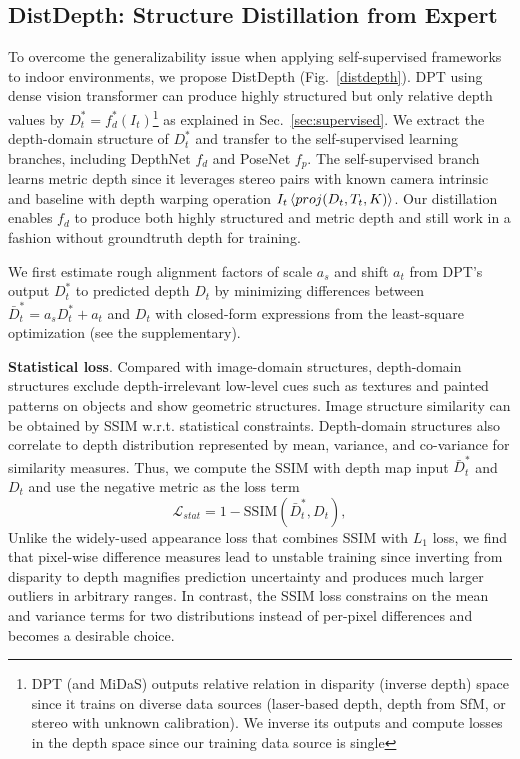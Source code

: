 \documentclass[10pt,twocolumn,letterpaper]{article}
\begin{document}
\subsection{DistDepth: Structure Distillation from Expert}
\label{sec:distdepth}
To overcome the generalizability issue when applying self-supervised frameworks to indoor environments, we propose DistDepth (Fig.~\ref{distdepth}). DPT \cite{Ranftl2021} using dense vision transformer can produce highly structured but only relative depth values by $D_t^*=f_d^*(I_t)$\footnote{DPT (and MiDaS) outputs relative relation in disparity (inverse depth) space since it trains on diverse data sources (laser-based depth, depth from SfM, or stereo with unknown calibration). We inverse its outputs and compute losses in the depth space since our training data source is single} as explained in Sec.~\ref{sec:supervised}. We extract the depth-domain structure of $D_t^*$ and transfer to the self-supervised learning branches, including DepthNet $f_d$ and PoseNet $f_p$. The self-supervised branch learns metric depth since it leverages stereo pairs with known camera intrinsic and baseline with depth warping operation $I_t \braket{proj(D_t, T_t, K)}$. Our distillation enables $f_d$ to produce both highly structured and metric depth and still work in a fashion without groundtruth depth for training.  

We first estimate rough alignment factors of scale $a_s$ and shift $a_t$ from DPT's output $D^*_t$ to predicted depth $D_t$ by minimizing differences between $\bar{D}^*_t=a_s D^*_t + a_t$ and $D_t$ with closed-form expressions from the least-square optimization (see the supplementary).


\textbf{Statistical loss}. Compared with image-domain structures, depth-domain structures exclude depth-irrelevant low-level cues such as textures and painted patterns on objects and show geometric structures. Image structure similarity can be obtained by SSIM \cite{wang2002universal,wang2004image,wang2003multiscale} w.r.t. statistical constraints. Depth-domain structures also correlate to depth distribution represented by mean, variance, and co-variance for similarity measures. Thus, we compute the SSIM with depth map input $\bar{D}_t^*$ and $D_t$ and use the negative metric as the loss term 
\begin{equation}
     \mathcal{L}_{stat}= 1-\text{SSIM}(\bar{D}_t^*,D_t),
\label{loss_statistical}
\end{equation}
Unlike the widely-used appearance loss that combines SSIM with $L_1$ loss, we find that pixel-wise difference measures lead to unstable training since inverting from disparity to depth magnifies prediction uncertainty and produces much larger outliers in arbitrary ranges. In contrast, the SSIM loss constrains on the mean and variance terms for two distributions instead of per-pixel differences and becomes a desirable choice.
\end{document}
